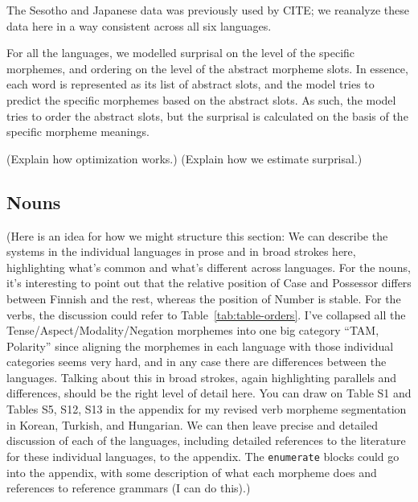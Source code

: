 \documentclass[11pt,letterpaper]{article}
\newcommand\michael[1]{{\color{red}(#1)}}
\newcommand\mhahn[1]{{\color{red}(#1)}}
\begin{document}
\begin{itemize}
The Sesotho and Japanese data was previously used by CITE; we reanalyze these data here in a way consistent across all six languages.

For all the languages, we modelled surprisal on the level of the specific morphemes, and ordering on the level of the abstract morpheme slots. In essence, each word is represented as its list of abstract slots, and the model tries to predict the specific morphemes based on the abstract slots. As such, the model tries to order the abstract slots, but the surprisal is calculated on the basis of the specific morpheme meanings.


\michael{Explain how optimization works.}
\michael{Explain how we estimate surprisal.}
\end{itemize}


\subsection{Nouns}

\mhahn{Here is an idea for how we might structure this section: We can describe the systems in the individual languages in prose and in broad strokes here, highlighting what's common and what's different across languages. For the nouns, it's interesting to point out that the relative position of Case and Possessor differs between Finnish and the rest, whereas the position of Number is stable. For the verbs, the discussion could refer to Table~\ref{tab:table-orders}. I've collapsed all the Tense/Aspect/Modality/Negation morphemes into one big category ``TAM, Polarity'' since aligning the morphemes in each language with those individual categories seems very hard, and in any case there are differences between the languages. Talking about this in broad strokes, again highlighting parallels and differences, should be the right level of detail here. You can draw on Table S1 and Tables S5, S12, S13 in the appendix for my revised verb morpheme segmentation in Korean, Turkish, and Hungarian. We can then leave precise and detailed discussion of each of the languages, including detailed references to the literature for these individual languages, to the appendix. The \texttt{enumerate} blocks could go into the appendix, with some description of what each morpheme does and references to reference grammars (I can do this).}
\end{document}
